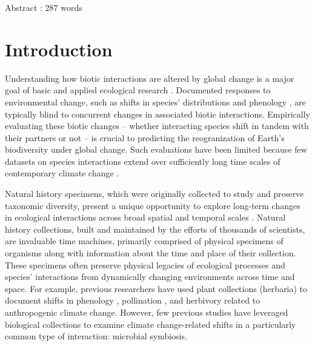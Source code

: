 \documentclass[11pt]{article}
\let\cite\citep
\begin{document}
Abstract : 287 words
	
	\newpage{}
	
	\section*{Introduction}
	
	
Understanding how biotic interactions are altered by global change is a major goal of basic and applied ecological research \cite{gilman2010framework,blois2013climate}.
Documented responses to environmental change, such as shifts in species' distributions \cite{aitken2008adaptation} and phenology \cite{piao2019plant}, are typically blind to concurrent changes in associated biotic interactions.
Empirically evaluating these biotic changes -- whether interacting species shift in tandem with their partners or not \cite{hillerislambers2013will} -- is crucial to predicting the reogranization of Earth's biodiversity under global change. 
Such evaluations have been limited because few datasets on species interactions extend over sufficiently long time scales of contemporary climate change \cite{poisot2021global}.

Natural history specimens, which were originally collected to study and preserve taxonomic diversity, present a unique opportunity to explore long-term changes in ecological interactions across broad spatial and temporal scales \citep{meineke2018unrealized}. 
Natural history collections, built and maintained by the efforts of thousands of scientists, are invaluable time machines, primarily comprised of physical specimens of organisms along with information about the time and place of their collection. 
These specimens often preserve physical legacies of ecological processes and species' interactions from dynamically changing environments across time and space.
For example, previous researchers have used plant collections (herbaria) to document shifts in phenology \citep{willis2017old, park2019herbarium,  berg2019examination}, pollination \citep{pauw2011reconstruction, duan2019century}, and herbivory \citep{meineke2019herbarium} related to anthropogenic climate change. 
However, few previous studies have leveraged biological collections to examine climate change-related shifts in a particularly common type of interaction: microbial symbiosis.
\end{document}
